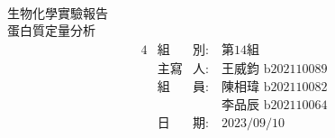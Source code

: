 


\pagestyle{empty}

\begin{center}
~\\
\vspace{2.7cm}
{\fontsize{36}{120}\selectfont 生物化學實驗報告}\\
\vspace{2.2cm}
{\fontsize{36}{80}\selectfont 蛋白質定量分析}
\vspace{2cm}
{\fontsize{18}{20}\selectfont 
  \begin{alignat*}{4}
    &\text{組}&\text{別}:\ &\text{第14組}\\
    &\text{主寫}&\text{人}:\ &\text{王威鈞 b202110089}\\
    &\text{組}&\text{員}:\ &\text{陳相瑋 b202110082}\\
         &&&\text{李品辰 b202110064}\\
    &\text{日}&\text{期}:\ &\text{2023/09/10}\\
  \end{alignat*}    
}


\end{center}
\newpage
